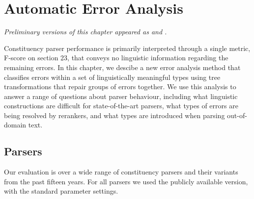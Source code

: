 \chapter{Automatic Error Analysis}

\begin{center}
\textit{
  Preliminary versions of this chapter appeared as \textcite{Kummerfeld-etal:2012:EMNLP} and \textcite{Kummerfeld-etal:2013:ACL}.
}
\end{center}

Constituency parser performance is primarily interpreted through a single metric, F-score on \wsj section 23, that conveys no linguistic information regarding the remaining errors.
In this chapter, we descibe a new error analysis method that classifies errors within a set of linguistically meaningful types using tree transformations that repair groups of errors together.
We use this analysis to answer a range of questions about parser behaviour, including what linguistic constructions are difficult for state-of-the-art parsers, what types of errors are being resolved by rerankers, and what types are introduced when parsing out-of-domain text.


\section{Parsers}

Our evaluation is over a wide range of \ptb constituency parsers and their variants from the past fifteen years.
For all parsers we used the publicly available version, with the standard parameter settings.

